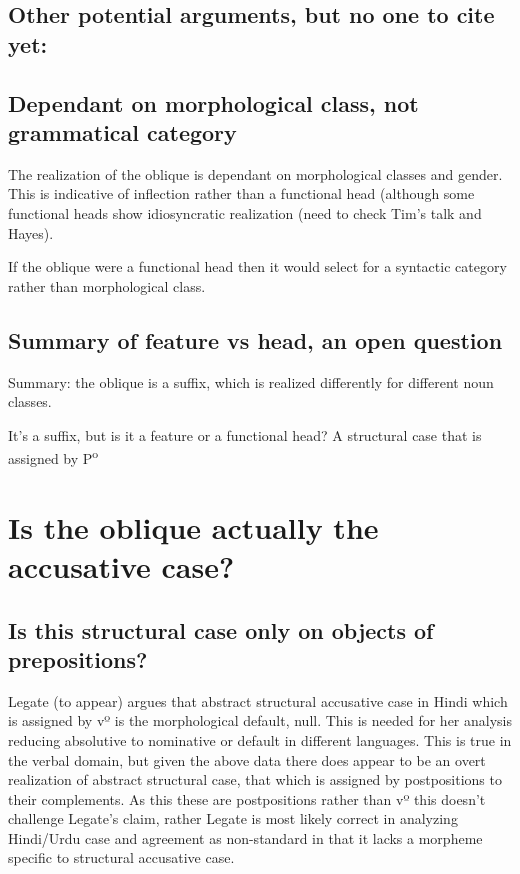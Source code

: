 \documentclass{article}
\begin{document}
\subsection{Other potential arguments, but no one to cite yet:}

\subsection{Dependant on morphological class, not grammatical category}

The realization of the oblique is dependant on morphological classes and gender. This is indicative of inflection rather than a functional head (although some functional heads show idiosyncratic realization (need to check Tim's talk and Hayes).

If the oblique were a functional head then it would select for a syntactic category rather than morphological class.

\subsection{Summary of feature vs head, an open question}

Summary: the oblique is a suffix, which is realized differently for different noun classes.

It's a suffix, but is it a feature or a functional head?
A structural case that is assigned by P\textsuperscript{o}



\section{Is the oblique actually the accusative case?}

\subsection{Is this structural case only on objects of prepositions?}

Legate (to appear) argues that abstract structural accusative case in Hindi which is assigned by vº is the morphological default, null. This is needed for her analysis reducing absolutive to nominative or default in different languages. This is true in the verbal domain, but given the above data there does appear to be an overt realization of abstract structural case, that which is assigned by postpositions to their complements. As this these are postpositions rather than vº  this doesn't challenge Legate's claim, rather Legate is most likely correct in analyzing Hindi/Urdu case and agreement as non-standard in that it lacks a morpheme specific to structural accusative case.
\end{document}
